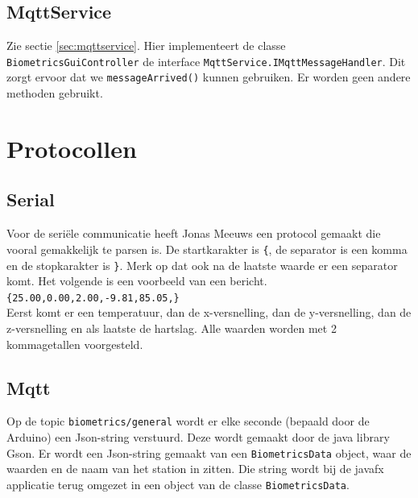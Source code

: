 \documentclass[a4paper]{report}
\newcommand{\code}[1]{\colorbox{light-gray}{\texttt{#1}}}
\begin{document}
        \subsection{MqttService}
            Zie sectie \ref{sec:mqttservice}.
            Hier implementeert de classe \code{BiometricsGuiController} de interface \code{MqttService.IMqttMessageHandler}.
            Dit zorgt ervoor dat we \code{messageArrived()} kunnen gebruiken.
            Er worden geen andere methoden gebruikt.

    \section{Protocollen}
        \subsection{Serial}
            Voor de seri\"ele communicatie heeft Jonas Meeuws een protocol gemaakt die vooral gemakkelijk te parsen is.
            De startkarakter is \verb!{!, de separator is een komma en de stopkarakter is \verb!}!.
            Merk op dat ook na de laatste waarde er een separator komt.
            Het volgende is een voorbeeld van een bericht.\\
            \indent \verb!{25.00,0.00,2.00,-9.81,85.05,}!\\
            Eerst komt er een temperatuur, dan de x-versnelling, dan de y-versnelling, dan de z-versnelling en als laatste de hartslag.
            Alle waarden worden met 2 kommagetallen voorgesteld.
            
        \subsection{Mqtt}
            Op de topic \code{biometrics/general} wordt er elke seconde (bepaald door de Arduino) een Json-string verstuurd.
            Deze wordt gemaakt door de java library Gson.
            Er wordt een Json-string gemaakt van een \code{BiometricsData} object, waar de waarden en de naam van het station in zitten.
            Die string wordt bij de javafx applicatie terug omgezet in een object van de classe \code{BiometricsData}.
            
\end{document}
